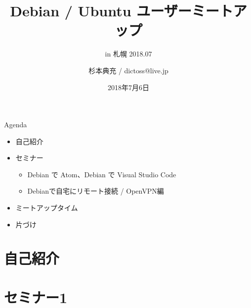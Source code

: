 \title{Debian / Ubuntu ユーザーミートアップ}
\subtitle{in 札幌 2018.07}
\author{杉本典充 / dictoss@live.jp}
\date{2018年7月6日}



\begin{frame}
\titlepage{}
\end{frame}

\begin{frame}{Agenda}
  \begin{itemize}
  \item 自己紹介
  \item セミナー
    \begin{itemize}
    \item Debian で Atom、Debian で Visual Studio Code
    \item Debianで自宅にリモート接続 / OpenVPN編
    \end{itemize}
  \item ミートアップタイム
  \item 片づけ
  \end{itemize}
\end{frame}


\section{自己紹介}

{\footnotesize
  
}

\section{セミナー1}

